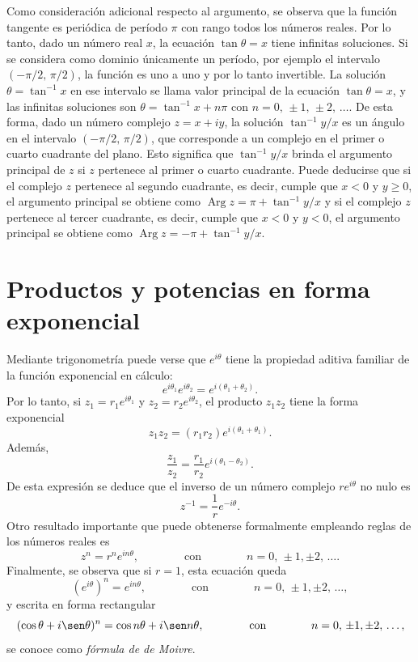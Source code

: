 \documentclass[a4paper]{report}
\DeclareMathOperator{\Arg}{Arg}
\begin{document}
Como consideración adicional respecto al argumento, se observa que la función tangente es periódica de período \(\pi\) con rango todos los números reales. Por lo tanto, dado un número real \(x\), la ecuación \(\tan\theta=x\) tiene infinitas soluciones. Si se considera como dominio únicamente un período, por ejemplo el intervalo \((-\pi/2,\,\pi/2)\), la función es uno a uno y por lo tanto invertible. La solución \(\theta=\tan^{-1}x\) en ese intervalo se llama valor principal de la ecuación \(\tan\theta=x\), y las infinitas soluciones son \(\theta=\tan^{-1}x+n\pi\) con \(n=0,\,\pm1,\,\pm2,\,\dots\). De esta forma, dado un número complejo \(z=x+iy\), la solución \(\tan^{-1}y/x\) es un ángulo en el intervalo \((-\pi/2,\,\pi/2)\), que corresponde a un complejo en el primer o cuarto cuadrante del plano. Esto significa que \(\tan^{-1}y/x\) brinda el argumento principal de \(z\) si \(z\) pertenece al primer o cuarto cuadrante. Puede deducirse que si el complejo \(z\) pertenece al segundo cuadrante, es decir, cumple que \(x<0\) y \(y\geq0\), el argumento principal se obtiene como \(\Arg z=\pi+\tan^{-1}y/x\) y si el complejo \(z\) pertenece al tercer cuadrante, es decir, cumple que \(x<0\) y \(y<0\), el argumento principal se obtiene como \(\Arg z=-\pi+\tan^{-1}y/x\).

\section{Productos y potencias en forma exponencial}\label{sec:exponential_form_products_and_powers}

Mediante trigonometría puede verse que \(e^{i\theta}\) tiene la propiedad aditiva familiar de la función exponencial en cálculo:
\[
 e^{i\theta_1}e^{i\theta_2}=e^{i(\theta_1+\theta_2)}.
\]
Por lo tanto, si \(z_1=r_1e^{i\theta_1}\) y \(z_2=r_2e^{i\theta_2}\), el producto \(z_1z_2\) tiene la forma exponencial
\[
 z_1z_2=(r_1r_2)e^{i(\theta_1+\theta_1)}.
\]
Además,
\[
 \frac{z_1}{z_2}=\frac{r_1}{r_2}e^{i(\theta_1-\theta_2)}.
\]
De esta expresión se deduce que el inverso de un número complejo \(re^{i\theta}\) no nulo es
\begin{equation}\label{eq:exponential_form_inverse}
  z^{-1}=\frac{1}{r}e^{-i\theta}.
\end{equation}
Otro resultado importante que puede obtenerse formalmente empleando reglas de los números reales es
\begin{equation}\label{eq:power_with_n_integer}
 z^n=r^ne^{in\theta},
 \qquad\qquad\textrm{con}\qquad\qquad
 n=0,\,\pm1,\pm2,\,\dots. 
\end{equation}
Finalmente, se observa que si \(r=1\), esta ecuación queda
\[
 (e^{i\theta})^n=e^{in\theta},
 \qquad\qquad\textrm{con}\qquad\qquad
 n=0,\,\pm1,\pm2,\,\dots,
\]
y escrita en forma rectangular
\[
 (\cos\theta+i\sen\theta)^n=\cos n\theta+i\sen n\theta,
 \qquad\qquad\textrm{con}\qquad\qquad
 n=0,\,\pm1,\pm2,\,\dots,
\]
se conoce como \emph{fórmula de de Moivre}.
\end{document}

